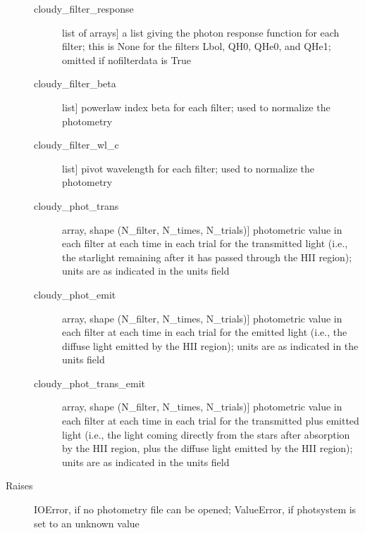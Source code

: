 \documentclass[letterpaper,10pt,english]{sphinxmanual}
\begin{document}
\begin{fulllineitems}
\begin{description}
\begin{description}
\item[{cloudy\_filter\_response}] \leavevmode{[}list of arrays{]}
a list giving the photon response function for each filter;
this is None for the filters Lbol, QH0, QHe0, and QHe1; omitted
if nofilterdata is True

\item[{cloudy\_filter\_beta}] \leavevmode{[}list{]}
powerlaw index beta for each filter; used to normalize the
photometry

\item[{cloudy\_filter\_wl\_c}] \leavevmode{[}list{]}
pivot wavelength for each filter; used to normalize the photometry

\item[{cloudy\_phot\_trans}] \leavevmode{[}array, shape (N\_filter, N\_times, N\_trials){]}
photometric value in each filter at each time in each trial for
the transmitted light (i.e., the starlight remaining after it
has passed through the HII region); units are as indicated in
the units field

\item[{cloudy\_phot\_emit}] \leavevmode{[}array, shape (N\_filter, N\_times, N\_trials){]}
photometric value in each filter at each time in each trial for
the emitted light (i.e., the diffuse light emitted by the HII
region); units are as indicated in the units field

\item[{cloudy\_phot\_trans\_emit}] \leavevmode{[}array, shape (N\_filter, N\_times, N\_trials){]}
photometric value in each filter at each time in each trial for
the transmitted plus emitted light (i.e., the light coming
directly from the stars after absorption by the HII region,
plus the diffuse light emitted by the HII region); units are as
indicated in the units field

\end{description}

\item[{Raises}] \leavevmode
IOError, if no photometry file can be opened;
ValueError, if photsystem is set to an unknown value

\end{description}

\end{fulllineitems}

\end{document}
